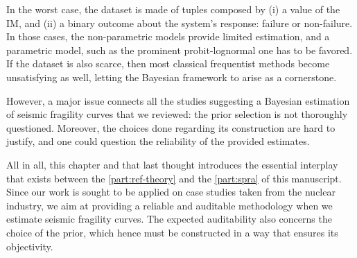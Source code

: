 In the worst case, the dataset is %
made of tuples composed by (i) a value of the IM, and (ii) a binary outcome about the system's response: failure or non-failure.
In those cases, the non-parametric models provide limited estimation, and a parametric model, such as the prominent probit-lognormal one has to be favored.
If the dataset is also scarce, then most classical frequentist methods become unsatisfying as well, letting the Bayesian framework to arise as a cornerstone.

However, 
a major issue connects all the studies 
suggesting a Bayesian estimation of seismic fragility curves that we reviewed: the prior selection is not thoroughly questioned. Moreover, the choices done regarding its construction are hard to justify, and one could question the reliability of the provided estimates.



All in all, this chapter and that last thought introduces the essential interplay that exists between the \cref{part:ref-theory} and the \cref{part:spra} of this manuscript.
Since our work is sought to be applied on case studies taken from the nuclear industry, we aim at providing a reliable and auditable methodology when we estimate seismic fragility curves.
The expected  auditability also concerns the choice of the prior, which hence must be constructed in a way that ensures its objectivity.





























